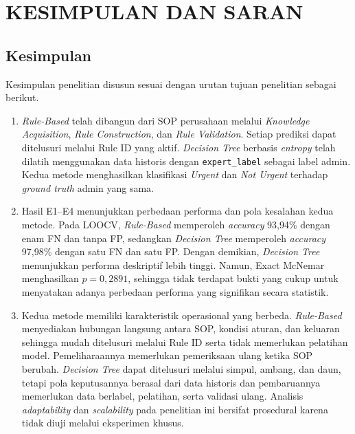 \chapter{KESIMPULAN DAN SARAN}

\section{Kesimpulan}

Kesimpulan penelitian disusun sesuai dengan urutan tujuan penelitian sebagai berikut.

\begin{enumerate}
    \item \textit{Rule-Based} telah dibangun dari SOP perusahaan melalui \textit{Knowledge Acquisition}, \textit{Rule Construction}, dan \textit{Rule Validation}. Setiap prediksi dapat ditelusuri melalui Rule ID yang aktif. \textit{Decision Tree} berbasis \textit{entropy} telah dilatih menggunakan data historis dengan \texttt{expert\_label} sebagai label admin. Kedua metode menghasilkan klasifikasi \textit{Urgent} dan \textit{Not Urgent} terhadap \textit{ground truth} admin yang sama.

    \item Hasil E1--E4 menunjukkan perbedaan performa dan pola kesalahan kedua metode. Pada LOOCV, \textit{Rule-Based} memperoleh \textit{accuracy} 93,94\% dengan enam FN dan tanpa FP, sedangkan \textit{Decision Tree} memperoleh \textit{accuracy} 97,98\% dengan satu FN dan satu FP. Dengan demikian, \textit{Decision Tree} menunjukkan performa deskriptif lebih tinggi. Namun, Exact McNemar menghasilkan \(p = 0{,}2891\), sehingga tidak terdapat bukti yang cukup untuk menyatakan adanya perbedaan performa yang signifikan secara statistik.

    \item Kedua metode memiliki karakteristik operasional yang berbeda. \textit{Rule-Based} menyediakan hubungan langsung antara SOP, kondisi aturan, dan keluaran sehingga mudah ditelusuri melalui Rule ID serta tidak memerlukan pelatihan model. Pemeliharaannya memerlukan pemeriksaan ulang ketika SOP berubah. \textit{Decision Tree} dapat ditelusuri melalui simpul, ambang, dan daun, tetapi pola keputusannya berasal dari data historis dan pembaruannya memerlukan data berlabel, pelatihan, serta validasi ulang. Analisis \textit{adaptability} dan \textit{scalability} pada penelitian ini bersifat prosedural karena tidak diuji melalui eksperimen khusus.
\end{enumerate}

